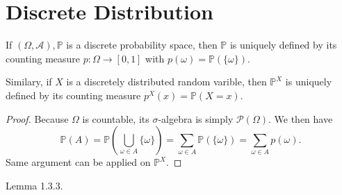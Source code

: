 \section{Discrete Distribution}

\begin{definition}
    
\end{definition}

\begin{lemma}
    If \((\Omega, \mathcal{A}), \mathbb{P}\) is a discrete probability space, then \(\mathbb{P}\) is uniquely defined by its counting measure \(p: \Omega \rightarrow [0, 1]\) with \(p(\omega) = \mathbb{P}( \{\omega\} )\).

    Similary, if \(X\) is a discretely distributed random varible, then \(\mathbb{P}^X\) is uniquely defined by its counting measure \(p^X (x) = \mathbb{P}(X = x)\).
\end{lemma}
\begin{proof}
    Because \(\Omega\) is countable, its \(\sigma\)-algebra is simply \(\mathcal{P}(\Omega)\). We then have
    \begin{equation}
        \mathbb{P}(A) = \mathbb{P} \left(\bigcup_{\omega \in A} \{\omega\}\right) = \sum_{\omega \in A} \mathbb{P}( \{\omega \} ) = \sum_{\omega \in A} p(\omega) \text{.}
    \end{equation}
    Same argument can be applied on \(\mathbb{P}^X\).
\end{proof}

\begin{lemma}
    Lemma 1.3.3.
\end{lemma}

\begin{theorem}
    
\end{theorem}

\begin{definition}
    
\end{definition}

\begin{definition}
    
\end{definition}

\begin{definition}
    
\end{definition}

